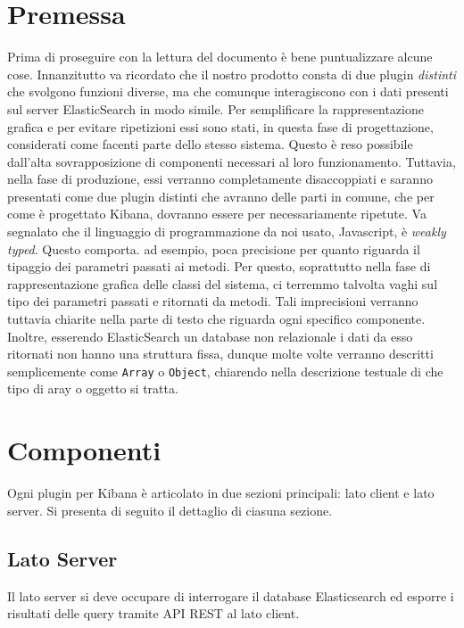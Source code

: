 
\section{Premessa}
\label{sec:premessa}
Prima di proseguire con la lettura del documento è bene puntualizzare alcune cose.
Innanzitutto va ricordato che il nostro prodotto consta di due plugin \emph{distinti} che svolgono funzioni diverse, ma che comunque interagiscono con i dati presenti sul server ElasticSearch in modo simile. Per semplificare la rappresentazione grafica e per evitare ripetizioni essi sono stati, in questa fase di progettazione, considerati come facenti parte dello stesso sistema. Questo è reso possibile dall'alta sovrapposizione di componenti necessari al loro funzionamento. Tuttavia, nella fase di produzione, essi verranno completamente disaccoppiati e saranno presentati come due plugin distinti che avranno delle parti in comune, che per come è progettato Kibana, dovranno essere per necessariamente ripetute. Va segnalato che il linguaggio di programmazione da noi usato, Javascript, è \emph{weakly typed}. Questo comporta. ad esempio, poca precisione per quanto riguarda il tipaggio dei parametri passati ai metodi. Per questo, soprattutto nella fase di rappresentazione grafica delle classi del sistema, ci terremmo talvolta vaghi sul tipo dei parametri passati e ritornati da metodi. Tali imprecisioni verranno tuttavia chiarite nella parte di testo che riguarda ogni specifico componente. Inoltre, esserendo ElasticSearch un database non relazionale i dati da esso ritornati non hanno una struttura fissa, dunque molte volte verranno descritti semplicemente come \texttt{Array} o \texttt{Object}, chiarendo nella descrizione testuale di che tipo di aray o oggetto si tratta.

\section{Componenti}

Ogni plugin per Kibana è articolato in due sezioni principali: lato client e lato server. Si presenta di seguito il dettaglio di ciasuna sezione.

\subsection{Lato Server}
Il lato server si deve occupare di interrogare il database Elasticsearch ed esporre i risultati delle query tramite API REST al lato client.

